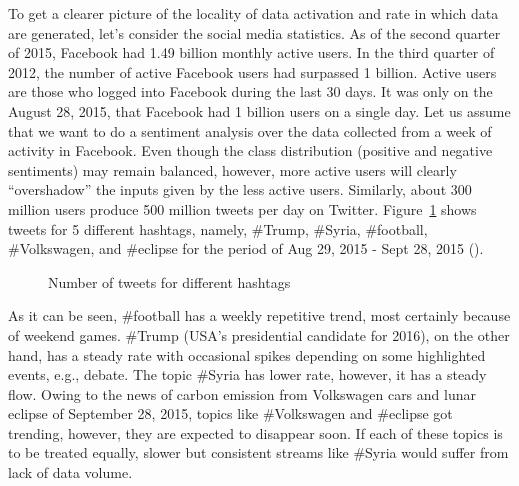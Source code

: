 To get a clearer picture of the locality of data activation and rate in which data are generated, let's consider the social media statistics. As of the second quarter of 2015, Facebook had 1.49 billion monthly active users. In the third quarter of 2012, the number of active Facebook users had surpassed 1 billion. Active users are those who logged into Facebook during the last 30 days. It was only on the August 28, 2015, that Facebook had 1 billion users on a single day. Let us assume that we want to do a sentiment analysis over the data collected from a week of activity in Facebook. Even though the class distribution (positive and negative sentiments)  may remain balanced, however, more active users will clearly ``overshadow'' the inputs given by the less active users. Similarly, about 300 million users produce 500 million tweets per day on Twitter. Figure~\ref{fig:intro:tweets} shows tweets for 5 different hashtags, namely, \#Trump, \#Syria, \#football, \#Volkswagen, and \#eclipse for the period of Aug 29, 2015 - Sept 28, 2015 (\cite{internet:topsy:tweets}). 
\begin{figure}[htbp] 
    \begin{center}
        \caption{Number of tweets for different hashtags }
        \label{fig:intro:tweets}
    \end{center}
\end{figure}
\noindent As it can be seen, \#football has a weekly repetitive trend, most certainly because of weekend games. \#Trump (USA's presidential candidate for 2016), on the other hand, has a steady rate with occasional spikes depending on some highlighted events, e.g., debate. The topic \#Syria has lower rate, however, it has a steady flow. Owing to the news of carbon emission from Volkswagen cars and lunar eclipse of September 28, 2015, topics like \#Volkswagen and \#eclipse got trending, however, they are expected to disappear soon. If each of these topics is to be treated equally, slower but consistent streams like \#Syria would suffer from lack of data volume. 

